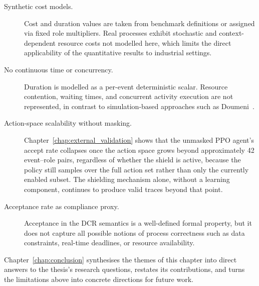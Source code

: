 \begin{description}
    \item[Synthetic cost models.]
    Cost and duration values are taken from benchmark
    definitions or assigned via fixed role multipliers.
    Real processes exhibit stochastic and context-dependent
    resource costs not modelled here, which limits the
    direct applicability of the quantitative results to
    industrial settings.

    \item[No continuous time or concurrency.]
    Duration is modelled as a per-event deterministic scalar.
    Resource contention, waiting times, and concurrent
    activity execution are not represented, in contrast to
    simulation-based approaches such as
    Doumeni~\cite{ArtemisDoumeniParetoAgentSimulator}.

    \item[Action-space scalability without masking.]
    Chapter~\ref{chap:external_validation} shows that the unmasked
    \ac{PPO} agent's accept rate collapses once the action space
    grows beyond approximately 42 event--role pairs, regardless of
    whether the shield is active, because the policy still samples
    over the full action set rather than only the currently enabled
    subset. The shielding mechanism alone, without a learning
    component, continues to produce valid traces beyond that point.

    \item[Acceptance rate as compliance proxy.]
    Acceptance in the \ac{DCR} semantics is a well-defined
    formal property, but it does not capture all possible
    notions of process correctness such as data constraints,
    real-time deadlines, or resource availability.

\end{description}

Chapter~\ref{chap:conclusion} synthesises the themes of this chapter into direct answers to the thesis's research questions, restates its contributions, and turns the limitations above into concrete directions for future work.
